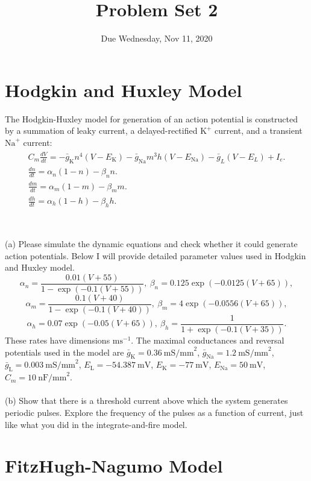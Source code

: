 \documentclass{article}
\title{Problem Set 2}
\date{Due Wednesday, Nov 11, 2020}
\begin{document}
\maketitle


\section*{Hodgkin and Huxley Model}

The Hodgkin-Huxley model for generation of an action potential is constructed by a summation of leaky current, a delayed-rectified $\textrm{K}^{+}$ current, and a transient $\textrm{Na}^{+}$ current:
\begin{eqnarray}
\begin{aligned}
C_{m}\frac{dV}{dt}=-\bar{g}_{\textrm{K}}n^{4}(V-E_{\textrm{K}})-\bar{g}_{\textrm{Na}}m^{3}h(V-E_{\textrm{Na}})-\bar{g}_L(V-E_L)+I_{e}.  \\  
\frac{dn}{dt}=\alpha_n (1-n) - \beta_n n. \\
\frac{dm}{dt}=\alpha_m(1-m) - \beta_m m. \\
\frac{dh}{dt}=\alpha_h(1-h) - \beta_h h. \\
\end{aligned}
\end{eqnarray}
\\
\\
(a) Please simulate the dynamic equations and check whether it could generate action potentials. Below I will provide detailed parameter values used in Hodgkin and Huxley model. 
\[\alpha_n=\frac{0.01(V+55)}{1-\exp(-0.1(V+55))}, \ \beta_n=0.125\exp(-0.0125(V+65)),\]
\[\alpha_m=\frac{0.1(V+40)}{1-\exp(-0.1(V+40))},\ \beta_m=4\exp(-0.0556(V+65)),\]
\[\alpha_h=0.07\exp(-0.05(V+65)), \ \beta_h=\frac{1}{1+\exp(-0.1(V+35))}. \]
These rates have dimensions $\textrm{ms}^{-1}$. The maximal conductances and reversal potentials used in the model are $\bar{g}_{\textrm{K}} = 0.36\  \textrm{mS/mm}^2$, $\bar{g}_{\textrm{Na}} = 1.2\  \textrm{mS/mm}^2$,   $\bar{g}_{\textrm{L}} = 0.003\  \textrm{mS/mm}^2$, $E_\textrm{L} = -54.387\  \textrm{mV}$, $E_\textrm{K} = -77\  \textrm{mV}$, $E_\textrm{Na} = 50\  \textrm{mV}$, $C_m = 10\ \textrm{nF/mm}^2$.
\\
\\
(b) Show that there is a threshold current above which the system generates periodic pulses. Explore the frequency of the pulses as a function of current, just like what you did in the integrate-and-fire model.

\section*{FitzHugh-Nagumo Model}
\end{document}

